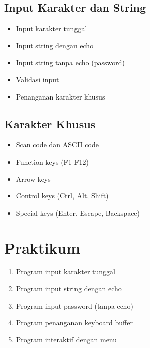 \subsection{Input Karakter dan String}
\begin{itemize}
\item Input karakter tunggal
\item Input string dengan echo
\item Input string tanpa echo (password)
\item Validasi input
\item Penanganan karakter khusus
\end{itemize}

\subsection{Karakter Khusus}
\begin{itemize}
\item Scan code dan ASCII code
\item Function keys (F1-F12)
\item Arrow keys
\item Control keys (Ctrl, Alt, Shift)
\item Special keys (Enter, Escape, Backspace)
\end{itemize}

\section{Praktikum}
\begin{enumerate}
\item Program input karakter tunggal
\item Program input string dengan echo
\item Program input password (tanpa echo)
\item Program penanganan keyboard buffer
\item Program interaktif dengan menu
\end{enumerate}

